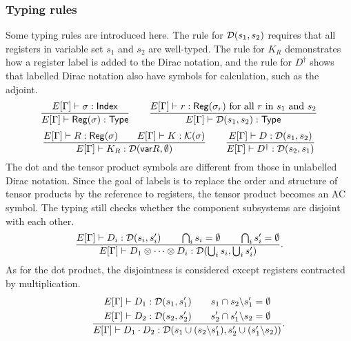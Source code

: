 \subsubsection{Typing rules}
Some typing rules are introduced here.
The rule for $\mathcal{D}(s_1, s_2)$ requires that all registers in variable set $s_1$ and $s_2$ are well-typed.
The rule for $K_R$ demonstrates how a register label is added to the Dirac notation, and the rule for $D^\dagger$ shows that labelled Dirac notation also have symbols for calculation, such as the adjoint.
\[
    \frac{E[\Gamma] \vdash  \sigma : \mathsf{Index}}{E[\Gamma] \vdash \mathsf{Reg}(\sigma) : \mathsf{Type}}
    \qquad
    \frac{E[\Gamma] \vdash r : \mathsf{Reg}(\sigma_r) \text{ for all $r$ in $s_1$ and $s_2$} }{E[\Gamma] \vdash \mathcal{D}(s_1, s_2) : \textsf{Type}} 
\]
\[
    \frac{E[\Gamma] \vdash R : \mathsf{Reg}(\sigma)\qquad E[\Gamma] \vdash K : \mathcal{K}(\sigma)}{E[\Gamma] \vdash K_R : \mathcal{D}(\mathsf{var} R, \emptyset)}
    \qquad
    \frac{E[\Gamma] \vdash D : \mathcal{D}(s_1,s_2)}{E[\Gamma] \vdash D^\dagger : \mathcal{D}(s_2,s_1)}
\]
The dot and the tensor product symbols are different from those in unlabelled Dirac notation. Since the goal of labels is to replace the order and structure of tensor products by the reference to registers, the tensor product becomes an AC symbol. The typing still checks whether the component subsystems are disjoint with each other.
\[
    \frac{
        E[\Gamma] \vdash D_i : \mathcal{D}(s_i,s_i') \qquad
        \bigcap_i s_i = \emptyset \qquad
        \bigcap_i s_i' = \emptyset
    }
    {E[\Gamma] \vdash D_1 \otimes \cdots \otimes D_i : \mathcal{D}(\bigcup_i s_i, \bigcup_i s_i')}.
\]
As for the dot product, the disjointness is considered except registers contracted by multiplication.
\[
    \qquad
    \frac{
        \begin{aligned}
            E[\Gamma] \vdash D_1 : \mathcal{D}(s_1,s_1') \\
            E[\Gamma] \vdash D_2 : \mathcal{D}(s_2,s_2')
        \end{aligned}
        \qquad 
        \begin{aligned}
            s_1 \cap s_2 \backslash s_1' = \emptyset \\
            s_2' \cap s_1' \backslash s_2 = \emptyset
        \end{aligned}
    }
    {E[\Gamma] \vdash D_1\cdot D_2 : \mathcal{D}(s_1 \cup (s_2\backslash s_1'), s_2' \cup (s_1'\backslash s_2))}.
\]

